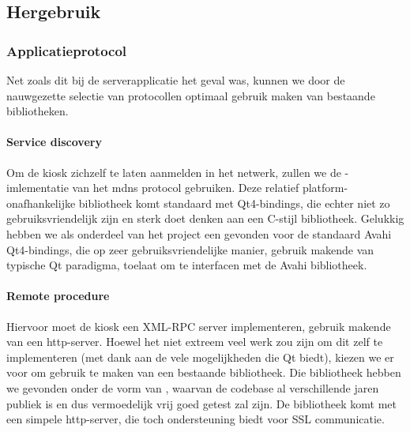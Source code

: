 \subsection{Hergebruik}

\subsubsection{Applicatieprotocol}

Net zoals dit bij de serverapplicatie het geval was, kunnen we door de nauwgezette selectie van protocollen optimaal gebruik maken van bestaande bibliotheken.

\paragraph{Service discovery} Om de kiosk zichzelf te laten aanmelden in het netwerk, zullen we de -imlementatie van het \ac{mdns} protocol gebruiken. Deze relatief platform-onafhankelijke bibliotheek komt standaard met Qt4-bindings, die echter niet zo gebruiksvriendelijk zijn en sterk doet denken aan een C-stijl bibliotheek. Gelukkig hebben we als onderdeel van het  project een  gevonden voor de standaard Avahi Qt4-bindings, die op zeer gebruiksvriendelijke manier, gebruik makende van typische Qt paradigma, toelaat om te interfacen met de Avahi bibliotheek.

\paragraph{Remote procedure} Hiervoor moet de kiosk een XML-RPC server implementeren, gebruik makende van een \ac{http}-server. Hoewel het niet extreem veel werk zou zijn om dit zelf te implementeren (met dank aan de vele mogelijkheden die Qt biedt), kiezen we er voor om gebruik te maken van een bestaande bibliotheek. Die bibliotheek hebben we gevonden onder de vorm van , waarvan de codebase al verschillende jaren publiek is en dus vermoedelijk vrij goed getest zal zijn. De bibliotheek komt met een simpele \ac{http}-server, die toch ondersteuning biedt voor SSL communicatie.

